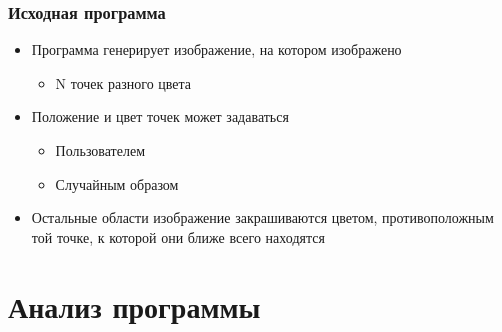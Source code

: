 \documentclass[10pt]{beamer}
\begin{document}
\begin{frame}%
\frametitle{Исходная программа}


\begin{block}

\begin{itemize}
\item Программа генерирует изображение, на котором изображено
\begin{itemize}
  \item N точек разного цвета
\end{itemize}
\item Положение и цвет точек может задаваться
\begin{itemize}
  \item Пользователем
  \item Случайным образом
\end{itemize}
\item Остальные области изображение закрашиваются цветом, противоположным той точке, к которой они ближе всего находятся
\end{itemize}

\end{block}

\end{frame}



\section{Анализ программы}
\end{document}
